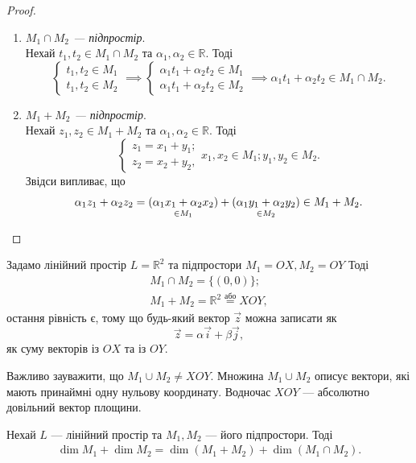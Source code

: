 \documentclass{math_library}
\begin{document}
	\begin{proof}
	\begin{enumerate}[topsep=0pt,label={\Roman*.},wide=0pt]
	\item \textit{$M_1 \cap M_2$ --- підпростір}.\\
	Нехай $t_1,t_2 \in M_1 \cap M_2$ та $\alpha_1,\alpha_2 \in \mathbb{R}$. Тоді
	\[
	\begin{cases} t_1, t_2 \in M_1 \\ t_1, t_2 \in M_2 \end{cases} \implies \begin{cases} \alpha_1 t_1 + \alpha_2 t_2 \in M_1 \\ \alpha_1 t_1 + \alpha_2 t_2 \in M_2 \end{cases} \implies \alpha_1 t_1 + \alpha_2 t_2 \in M_1 \cap M_2.
	\]
	\item \textit{$M_1 + M_2$ --- підпростір}.\\
	Нехай $z_1,z_2 \in M_1+M_2$ та $\alpha_1,\alpha_2 \in \mathbb{R}$. Тоді
	\[
	\begin{cases} z_1 = x_1 + y_1; \\ z_2 = x_2 + y_2, \end{cases}x_1,x_2 \in M_1; y_1, y_2 \in M_2.
	\]
	Звідси випливає, що
	\[
	\alpha_1 z_1 + \alpha_2 z_2 = \underset{\in M_1}{(\alpha_1 x_1 + \alpha_2 x_2)} + \underset{\in M_2}{(\alpha_1 y_1 + \alpha_2 y_2)} \in M_1 + M_2. \qedhere
	\]
	\end{enumerate}
	\end{proof}
	
	\begin{example}
	Задамо лінійний простір $L=\mathbb{R}^2$ та підпростори $M_1 = OX, M_2 = OY$ Тоді
	\begin{align*}
	M_1 \cap M_2 = \{(0,0)\}; \\
	M_1 + M_2 = \mathbb{R}^2 \overset{\text{або}}{=} XOY,
	\end{align*}
	остання рівність є, тому що будь-який вектор $\vec{z}$ можна записати як
	\[
	\vec{z} = \alpha \vec{i} + \beta \vec{j},
	\]
	як суму векторів із $OX$ та із $OY$.
	\end{example}
	
	\begin{remark}
	Важливо зауважити, що $M_1 \cup M_2 \neq XOY$. Множина $M_1 \cup M_2$ описує вектори, які мають принаймні одну нульову координату. Водночас $XOY$ --- абсолютно довільний вектор площини.
	\end{remark}
	
	\begin{theorem}
	Нехай $L$ --- лінійний простір та $M_1,M_2$ --- його підпростори. Тоді
	\begin{align*}
	\dim{M_1} + \dim{M_2} = \dim(M_1 + M_2) + \dim(M_1 \cap M_2).
	\end{align*}
	\end{theorem}
	
\end{document}

